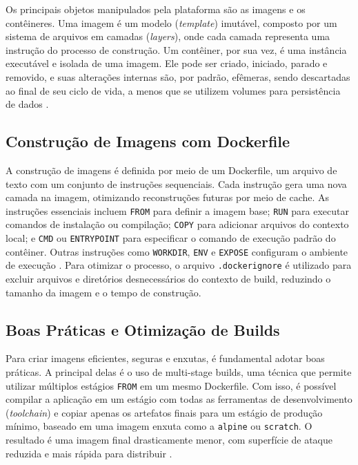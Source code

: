 Os principais objetos manipulados pela plataforma são as imagens e os contêineres. Uma imagem é um modelo (\textit{template}) imutável, composto por um sistema de arquivos em camadas (\textit{layers}), onde cada camada representa uma instrução do processo de construção. Um contêiner, por sua vez, é uma instância executável e isolada de uma imagem. Ele pode ser criado, iniciado, parado e removido, e suas alterações internas são, por padrão, efêmeras, sendo descartadas ao final de seu ciclo de vida, a menos que se utilizem volumes para persistência de dados \cite{docker_overview}.

\subsection{Construção de Imagens com Dockerfile}
\label{sec:dockerfile-construcao}

A construção de imagens é definida por meio de um Dockerfile, um arquivo de texto com um conjunto de instruções sequenciais. Cada instrução gera uma nova camada na imagem, otimizando reconstruções futuras por meio de cache. As instruções essenciais incluem \texttt{FROM} para definir a imagem base; \texttt{RUN} para executar comandos de instalação ou compilação; \texttt{COPY} para adicionar arquivos do contexto local; e \texttt{CMD} ou \texttt{ENTRYPOINT} para especificar o comando de execução padrão do contêiner. Outras instruções como \texttt{WORKDIR}, \texttt{ENV} e \texttt{EXPOSE} configuram o ambiente de execução \cite{dockerfile_ref}. Para otimizar o processo, o arquivo \texttt{.dockerignore} é utilizado para excluir arquivos e diretórios desnecessários do contexto de build, reduzindo o tamanho da imagem e o tempo de construção.

\subsection{Boas Práticas e Otimização de Builds}
\label{sec:docker-boas-praticas}

Para criar imagens eficientes, seguras e enxutas, é fundamental adotar boas práticas. A principal delas é o uso de multi-stage builds, uma técnica que permite utilizar múltiplos estágios \texttt{FROM} em um mesmo Dockerfile. Com isso, é possível compilar a aplicação em um estágio com todas as ferramentas de desenvolvimento (\textit{toolchain}) e copiar apenas os artefatos finais para um estágio de produção mínimo, baseado em uma imagem enxuta como a \texttt{alpine} ou \texttt{scratch}. O resultado é uma imagem final drasticamente menor, com superfície de ataque reduzida e mais rápida para distribuir \cite{dockerfile_ref}.

